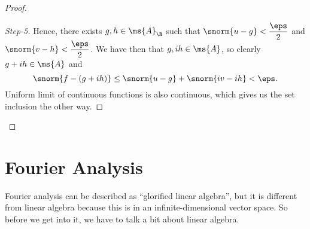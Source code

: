 \begin{proof}
\begin{proof}[Step-5]
    \medskip

    Hence, there exists \(g,h\in\ms{A}_{\R}\) such that \(\snorm{u-g}<\displaystyle\frac{\eps}{2}\) and \(\snorm{v-h}<\displaystyle\frac{\eps}{2}\). We have then that \(g,ih\in\ms{A}\), so clearly \(g+ih\in\ms{A}\) and 
    \begin{equation*} 
        \snorm{f-(g+ih)}\leq\snorm{u-g}+\snorm{iv-ih}<\eps.
    \end{equation*}
    Uniform limit of continuous functions is also continuous, which gives us the set inclusion the other way.
\end{proof}
\end{proof}

\section{Fourier Analysis}
Fourier analysis can be described as ``glorified linear algebra'', but it is different from linear algebra because this is in an infinite-dimensional vector space. So before we get into it, we have to talk a bit about linear algebra.

